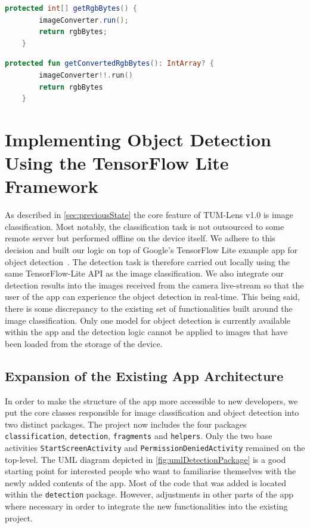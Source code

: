 \documentclass[
			   fontsize=11pt,
               paper=a4,
               bibliography=totoc,
               idxtotoc,
               headsepline,
               footsepline,
               footinclude=false,
               BCOR=12mm,
               DIV=13,
               openany,   %
               oneside    %
               ]
               {scrbook}
\newcommand{\code}[1]{\lstinline[basicstyle = \ttfamily\small]{#1}} %
\begin{document}
\begin{lstlisting}[style=standard, language=Java, label=code:bugSourceJava, caption={Java code that lead to the introduction of a bug after using Android Studio's built-in Java to Kotlin conversion command. The bug was created when this code block was substituted with a default getter in Kotlin omitting parts of its logic.}]
	protected int[] getRgbBytes() {
		imageConverter.run();
		return rgbBytes;
	}
\end{lstlisting}

\begin{lstlisting}[style=standard, language=Kotlin, label=code:bugSolutionKotlin, caption={Complementing the default Kotlin getter with this method solved the problem.}]
	protected fun getConvertedRgbBytes(): IntArray? {
		imageConverter!!.run()
		return rgbBytes
	}
\end{lstlisting}

\chapter{Implementing Object Detection Using the TensorFlow Lite Framework}

As described in \autoref{sec:previousState} the core feature of TUM-Lens v1.0 is image classification. Most notably, the classification task is not outsourced to some remote server but performed offline on the device itself. We adhere to this decision and built our logic on top of Google's TensorFlow Lite example app for object detection~\cite{tfSampleAppGuide, tfSampleAppRepo}. The detection task is therefore carried out locally using the same TensorFlow-Lite API as the image classification. We also integrate our detection results into the images received from the camera live-stream so that the user of the app can experience the object detection in real-time. This being said, there is some discrepancy to the existing set of functionalities built around the image classification. Only one model for object detection is currently available within the app and the detection logic cannot be applied to images that have been loaded from the storage of the device.

\section{Expansion of the Existing App Architecture}

In order to make the structure of the app more accessible to new developers, we put the core classes responsible for image classification and object detection into two distinct packages. The project now includes the four packages \code{classification}, \code{detection}, \code{fragments} and \code{helpers}. Only the two base activities \code{StartScreenActivity} and \code{PermissionDeniedActivity} remained on the top-level. The UML diagram depicted in \autoref{fig:umlDetectionPackage} is a good starting point for interested people who want to familiarise themselves with the newly added contents of the app. Most of the code that was added is located within the \code{detection} package. However, adjustments in other parts of the app where necessary in order to integrate the new functionalities into the existing project.
\end{document}

